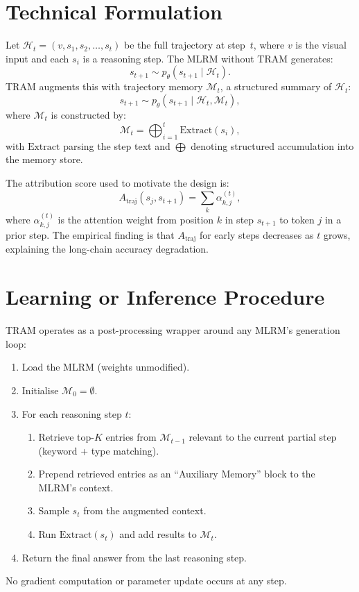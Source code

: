 \documentclass[10pt,twocolumn]{article}
\begin{document}
\section{Technical Formulation}

Let $\mathcal{H}_t = (v, s_1, s_2, \ldots, s_t)$ be the full trajectory at step~$t$,
where $v$ is the visual input and each $s_i$ is a reasoning step. The MLRM
without TRAM generates:
\[
s_{t+1} \sim p_\theta(s_{t+1} \mid \mathcal{H}_t).
\]
TRAM augments this with trajectory memory $\mathcal{M}_t$, a structured
summary of $\mathcal{H}_t$:
\[
s_{t+1} \sim p_\theta\!\left(s_{t+1} \mid \mathcal{H}_t, \mathcal{M}_t\right),
\]
where $\mathcal{M}_t$ is constructed by:
\[
\mathcal{M}_t = \bigoplus_{i=1}^{t} \mathrm{Extract}(s_i),
\]
with $\mathrm{Extract}$ parsing the step text and $\bigoplus$ denoting
structured accumulation into the memory store.

The attribution score used to motivate the design is:
\[
A_{\mathrm{traj}}(s_j, s_{t+1}) = \sum_{k} \alpha_{k,j}^{(t)},
\]
where $\alpha_{k,j}^{(t)}$ is the attention weight from position $k$ in
step $s_{t+1}$ to token $j$ in a prior step. The empirical finding is that
$A_{\mathrm{traj}}$ for early steps decreases as $t$ grows, explaining the
long-chain accuracy degradation.

\section{Learning or Inference Procedure}

TRAM operates as a post-processing wrapper around any MLRM's generation loop:
\begin{enumerate}[itemsep=2pt,parsep=0pt]
  \item Load the MLRM (weights unmodified).
  \item Initialise $\mathcal{M}_0 = \emptyset$.
  \item For each reasoning step $t$:
    \begin{enumerate}[itemsep=1pt,parsep=0pt]
      \item Retrieve top-$K$ entries from $\mathcal{M}_{t-1}$ relevant to the
        current partial step (keyword + type matching).
      \item Prepend retrieved entries as an ``Auxiliary Memory'' block to the
        MLRM's context.
      \item Sample $s_t$ from the augmented context.
      \item Run $\mathrm{Extract}(s_t)$ and add results to $\mathcal{M}_t$.
    \end{enumerate}
  \item Return the final answer from the last reasoning step.
\end{enumerate}
No gradient computation or parameter update occurs at any step.
\end{document}
